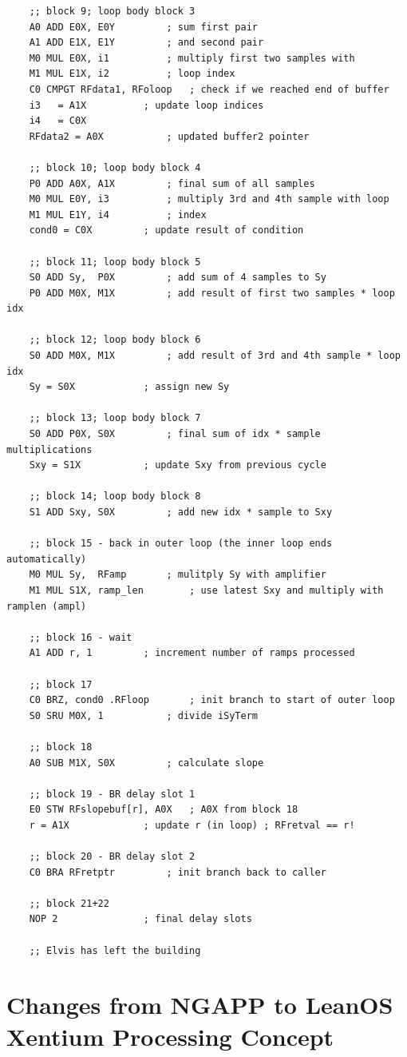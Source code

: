 \begin{lstlisting}
	;; block 9; loop body block 3
	A0 ADD E0X, E0Y			; sum first pair
	A1 ADD E1X, E1Y			; and second pair
	M0 MUL E0X, i1			; multiply first two samples with
	M1 MUL E1X, i2			; loop index
	C0 CMPGT RFdata1, RFoloop	; check if we reached end of buffer
	i3   = A1X			; update loop indices
	i4   = C0X
	RFdata2 = A0X			; updated buffer2 pointer

	;; block 10; loop body block 4
	P0 ADD A0X, A1X			; final sum of all samples
	M0 MUL E0Y, i3			; multiply 3rd and 4th sample with loop
	M1 MUL E1Y, i4			; index
	cond0 = C0X			; update result of condition
	
	;; block 11; loop body block 5
	S0 ADD Sy,  P0X			; add sum of 4 samples to Sy
	P0 ADD M0X, M1X			; add result of first two samples * loop idx

	;; block 12; loop body block 6
	S0 ADD M0X, M1X			; add result of 3rd and 4th sample * loop idx
	Sy = S0X			; assign new Sy
	
	;; block 13; loop body block 7
	S0 ADD P0X, S0X			; final sum of idx * sample multiplications	
	Sxy = S1X			; update Sxy from previous cycle

	;; block 14; loop body block 8
	S1 ADD Sxy, S0X	 		; add new idx * sample to Sxy
		
	;; block 15 - back in outer loop (the inner loop ends automatically)
	M0 MUL Sy,  RFamp		; mulitply Sy with amplifier
	M1 MUL S1X, ramp_len		; use latest Sxy and multiply with ramplen (ampl)

	;; block 16 - wait 
	A1 ADD r, 1			; increment number of ramps processed 

	;; block 17
	C0 BRZ, cond0 .RFloop		; init branch to start of outer loop
	S0 SRU M0X, 1			; divide iSyTerm

	;; block 18	
	A0 SUB M1X, S0X			; calculate slope

	;; block 19 - BR delay slot 1
	E0 STW RFslopebuf[r], A0X	; A0X from block 18
	r = A1X				; update r (in loop) ; RFretval == r!

	;; block 20 - BR delay slot 2
	C0 BRA RFretptr			; init branch back to caller

	;; block 21+22
	NOP 2				; final delay slots

	;; Elvis has left the building
\end{lstlisting}




\appendix
\chapter {Changes from NGAPP to LeanOS Xentium Processing Concept}

